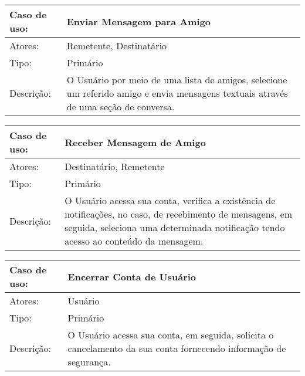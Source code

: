 \documentclass[12pt,a4paper,onecolumn,titlepage]{article}
\begin{document}
\begin{table}[h!]
\begin{center}
\begin{tabular}{p{2.5cm} p{9.5cm}}
Caso de uso: & \textbf{Enviar Mensagem para Amigo} \\ \hline
Atores: & Remetente, Destinatário \\ \hline
Tipo: & Primário \\ \hline
Descrição: & O Usuário por meio de uma lista de amigos, selecione um referido amigo e envia mensagens textuais através de uma seção de conversa.

\end{tabular}
\end{center}
\end{table}


\begin{table}[h!]
\begin{center}
\begin{tabular}{p{2.5cm} p{9.5cm}}
Caso de uso: & \textbf{Receber Mensagem de Amigo} \\ \hline
Atores: & Destinatário, Remetente \\ \hline
Tipo: & Primário \\ \hline
Descrição: & O Usuário acessa sua conta, verifica a existência de notificações, no caso, de recebimento de mensagens, em seguida, seleciona uma determinada notificação tendo acesso ao conteúdo da mensagem.

\end{tabular}
\end{center}
\end{table}


\begin{table}[h!]
\begin{center}
\begin{tabular}{p{2.5cm} p{9.5cm}}
Caso de uso: & \textbf{Encerrar Conta de Usuário} \\ \hline
Atores: & Usuário \\ \hline
Tipo: & Primário \\ \hline
Descrição: & O Usuário acessa sua conta, em seguida, solicita o cancelamento da sua conta fornecendo informação de segurança.

\end{tabular}
\end{center}
\end{table}
\end{document}
